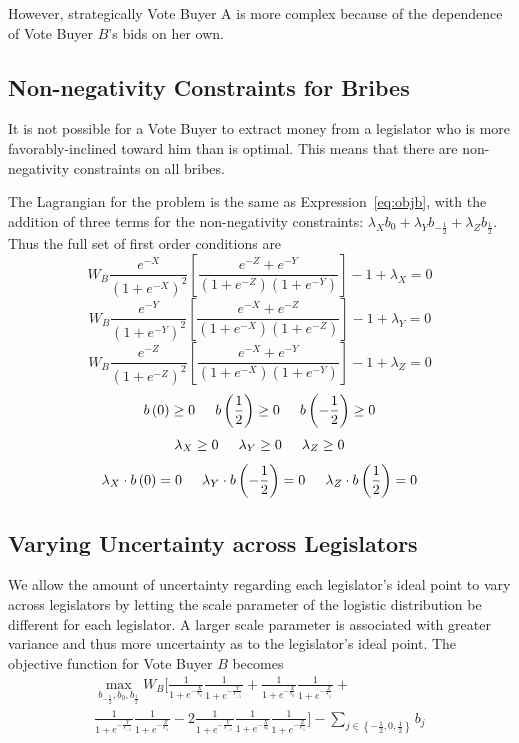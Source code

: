 \documentclass[12pt]{article}
\begin{document}
However, strategically Vote Buyer A is more complex because of the dependence of Vote Buyer $B$'s bids on her own.
				
\subsection{Non-negativity Constraints for Bribes}
\label{sec:nonneg}
It is not possible for a Vote Buyer to extract money from a legislator who is more favorably-inclined toward him than is optimal. This means that there are non-negativity constraints on all bribes. 

The Lagrangian for the problem is the same as Expression~\ref{eq:objb}, with the addition of three terms for the non-negativity constraints: $\lambda_X b_0 + \lambda_Y b_{-\frac{1}{2}} + \lambda_Z b_{\frac{1}{2}}$. Thus the full set of first order conditions are
\[
    W_B\frac{e^{-X}}{\left(1+e^{-X}\right)^2}\left[\frac{e^{-Z} + e^{-Y}}{\left(1+e^{-Z}\right)\left(1+e^{-Y}\right)} \right] - 1 + \lambda_X = 0
\]
\[
    W_B\frac{e^{-Y}}{\left(1+e^{-Y}\right)^2}\left[\frac{e^{-X} + e^{-Z}}{\left(1+e^{-X}\right)\left(1+e^{-Z}\right)} \right] - 1 + \lambda_Y = 0 
\]
\[
    W_B\frac{e^{-Z}}{\left(1+e^{-Z}\right)^2}\left[\frac{e^{-X} + e^{-Y}}{\left(1+e^{-X}\right)\left(1+e^{-Y}\right)} \right] - 1 + \lambda_Z = 0
\]
\[
  b\left(0\right) \geq0 \hskip.2in b\left(\frac{1}{2}\right) \geq0 \hskip.2in b\left(-\frac{1}{2}\right) \geq0 
\]
\[
  \lambda_X \geq0 \hskip.2in \lambda_Y \geq0 \hskip.2in \lambda_Z \geq0 
\]
\[
  \lambda_X \cdot b\left(0\right) = 0 \hskip.2in \lambda_Y \cdot b\left(-\frac{1}{2}\right) = 0 \hskip.2in \lambda_Z \cdot b\left(\frac{1}{2}\right) = 0 
\]



\subsection{Varying Uncertainty across Legislators}
\label{sec:uncert}
We allow the amount of uncertainty regarding each legislator's ideal point to vary across legislators by letting the scale parameter of the logistic distribution be different for each legislator. A larger scale parameter is associated with greater variance and thus more uncertainty as to the legislator's ideal point. The objective function for Vote Buyer $B$ becomes
 \begin{multline}
    \max_{b_{-\frac{1}{2}}, b_0, b_{\frac{1}{2}}} 
					W_B \biggl[ \frac{1}{1+e^{-\frac{X}{s_0}}} \frac{1}{1+e^{-\frac{Y}{s_{-.5}}}} +
					\frac{1}{1+e^{-\frac{X}{s_0}}} \frac{1}{1+e^{-\frac{Z}{s_{.5}}}} + \\
					\frac{1}{1+e^{-\frac{Y}{s_{-.5}}}} \frac{1}{1+e^{-\frac{Z}{s_{.5}}}} - 2	\frac{1}{1+e^{-\frac{Y}{s_{-.5}}}} \frac{1}{1+e^{-\frac{X}{s_0}}} \frac{1}{1+e^{-\frac{Z}{s_{.5}}}} \biggr] - \sum_{j\in \left\{-\frac{1}{2}, 0,\frac{1}{2}\right\}} b_j
	\end{multline}
\end{document}
